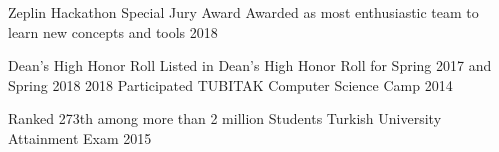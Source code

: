 

\cvsubsection{ }
\vspace{-3.2mm}
\begin{cvhonors}
  \cvhonor
    {Zeplin Hackathon Special Jury Award} %
    {Awarded as most enthusiastic team to learn new concepts and tools} %
    {} %
    {2018} %


  \cvhonor
    {Dean’s High Honor Roll } %
    {Listed in Dean's High Honor Roll for Spring 2017 and Spring 2018} %
    {} %
    {2018} %
  \cvhonor
    {Participated} %
    {TUBITAK Computer Science Camp} %
    {} %
    {2014} %

  \cvhonor
    {Ranked 273th among more than 2 million Students} %
    {Turkish University Attainment Exam} %
    {} %
    {2015} %
\begin{comment}
  \cvhonor
    {Ranked 1th among more than 1 million Students} %
    {Turkish High School Attainment Exam} %
    {} %
    {2011} %



  \cvhonor
    {Ranked in top 50} %
    {TUBITAK National Middle School Mathematic Olympiads} %
    {} %
    {2014} %


  \cvhonor
    {Vehbi Koc Scholar} %
    {Awarded for SPA over 3.50 /4.00 in Fall 2016, Spring 2017 and Fall 2017} %
    {} %
    {2017} %
\end{comment}
\end{cvhonors}



